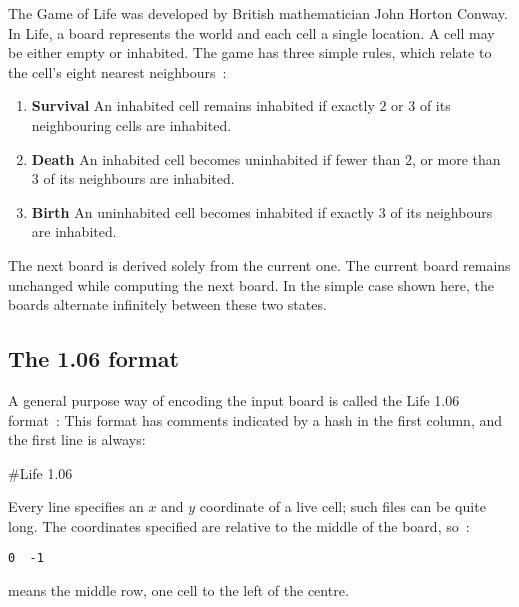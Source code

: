 


The Game of Life was developed by British mathematician
John Horton Conway. In Life, a board represents the world
and each cell a single location. A cell may be either empty
or inhabited. The game has three simple rules, which relate to the
cell's eight nearest neighbours~:
\begin{enumerate}
\item {\bf Survival} An inhabited cell remains inhabited if
exactly $2$ or $3$ of its neighbouring cells are inhabited.
\item {\bf Death} An inhabited cell becomes uninhabited if 
fewer than $2$, or more than $3$ of its neighbours are inhabited.
\item {\bf Birth} An uninhabited cell becomes inhabited if exactly
$3$ of its neighbours are inhabited.
\end{enumerate}

The next board is derived solely from the current one. The current board
remains unchanged while computing the next board.  In the simple case
shown here, the boards alternate infinitely between these two states.

\begin{center}
\end{center}

\subsection*{The 1.06 format}

A general purpose way of encoding the input board is
called the Life 1.06 format~:
This format has comments indicated by a hash in the first column,
and the first line is always:
\begin{terminaloutput}
#Life 1.06
\end{terminaloutput}
Every line specifies an $x$ and $y$ coordinate of a live cell;
such files can be quite long.
The coordinates specified are relative to the middle of the board,
so~:
\begin{verbatim}
0  -1
\end{verbatim}
means the middle row, one cell to the left of the centre.

